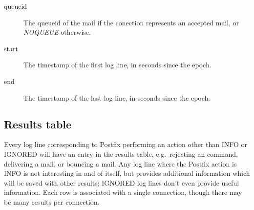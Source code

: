 \documentclass[a4paper,12pt,draft]{article}
\begin{document}
\begin{description}
    \item [queueid] The queueid of the mail if the conection represents an
        accepted mail, or \textit{NOQUEUE\/} otherwise.

    \item [start] The timestamp of the first log line, in seconds since the
        epoch.

    \item [end] The timestamp of the last log line, in seconds since the
        epoch.

\end{description}

\subsection{Results table}

\label{results table}

Every log line corresponding to Postfix performing an action other than
INFO or IGNORED will have an entry in the results table, e.g.\ rejecting an
\SMTP{} command, delivering a mail, or bouncing a mail.  Any log line where
the Postfix action is INFO is not interesting in and of itself, but
provides additional information which will be saved with other results;
IGNORED log lines don't even provide useful information.  Each row is
associated with a single connection, though there may be many results per
connection.
\end{document}
